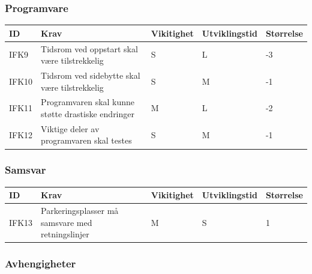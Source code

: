 \documentclass[12pt]{article}
\newcommand{\cellr}{\cellcolor{red!25}}
\newcommand{\cello}{\cellcolor{orange!25}}
\newcommand{\celll}{\cellcolor{lime!25}}
\begin{document}
        \subsubsection{Programvare}

        \begin{tabular}{|p{2cm}|p{6cm}|
            >{\centering\arraybackslash}p{2cm}|
            >{\centering\arraybackslash}p{2cm}|
            >{\centering\arraybackslash}p{2cm}|}
            \hline
            \bf ID & \bf Krav & \bf Vikitighet & \bf Utviklingstid & \bf Størrelse\\
            \hline
            IFK9
            &
            Tidsrom ved oppstart skal være tilstrekkelig
            & S & L & \cellr -3\\
            \hline
            IFK10
            &
            Tidsrom ved sidebytte skal være tilstrekkelig
            & S & M & \cello -1\\
            \hline
            IFK11
            &
            Programvaren skal kunne støtte drastiske endringer
            & M & L & \cello -2\\
            \hline
            IFK12
            &
            Viktige deler av programvaren skal testes
            & S & M & \cello -1\\
            \hline
        \end{tabular}

        \subsubsection{Samsvar}
        
        \begin{tabular}{|p{2cm}|p{6cm}|
            >{\centering\arraybackslash}p{2cm}|
            >{\centering\arraybackslash}p{2cm}|
            >{\centering\arraybackslash}p{2cm}|}
            \hline
            \bf ID & \bf Krav & \bf Vikitighet & \bf Utviklingstid & \bf Størrelse\\
            \hline
            IFK13
            &
            Parkeringsplasser må samsvare med retningslinjer
            & M & S & \celll 1\\
            \hline
        \end{tabular}

        \subsubsection{Avhengigheter}
\end{document}
